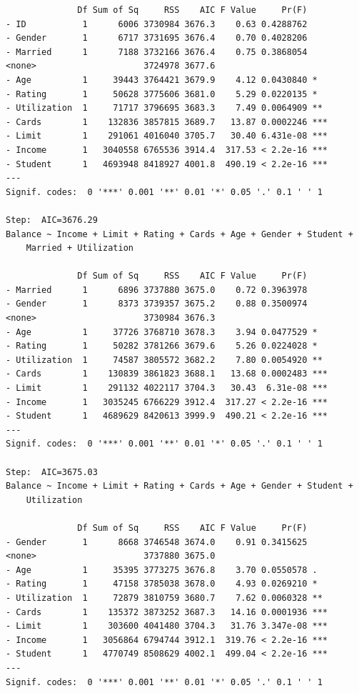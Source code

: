 \documentclass[
]{article}
\begin{document}
\begin{verbatim}
              Df Sum of Sq     RSS    AIC F Value     Pr(F)    
- ID           1      6006 3730984 3676.3    0.63 0.4288762    
- Gender       1      6717 3731695 3676.4    0.70 0.4028206    
- Married      1      7188 3732166 3676.4    0.75 0.3868054    
<none>                     3724978 3677.6                      
- Age          1     39443 3764421 3679.9    4.12 0.0430840 *  
- Rating       1     50628 3775606 3681.0    5.29 0.0220135 *  
- Utilization  1     71717 3796695 3683.3    7.49 0.0064909 ** 
- Cards        1    132836 3857815 3689.7   13.87 0.0002246 ***
- Limit        1    291061 4016040 3705.7   30.40 6.431e-08 ***
- Income       1   3040558 6765536 3914.4  317.53 < 2.2e-16 ***
- Student      1   4693948 8418927 4001.8  490.19 < 2.2e-16 ***
---
Signif. codes:  0 '***' 0.001 '**' 0.01 '*' 0.05 '.' 0.1 ' ' 1

Step:  AIC=3676.29
Balance ~ Income + Limit + Rating + Cards + Age + Gender + Student + 
    Married + Utilization

              Df Sum of Sq     RSS    AIC F Value     Pr(F)    
- Married      1      6896 3737880 3675.0    0.72 0.3963978    
- Gender       1      8373 3739357 3675.2    0.88 0.3500974    
<none>                     3730984 3676.3                      
- Age          1     37726 3768710 3678.3    3.94 0.0477529 *  
- Rating       1     50282 3781266 3679.6    5.26 0.0224028 *  
- Utilization  1     74587 3805572 3682.2    7.80 0.0054920 ** 
- Cards        1    130839 3861823 3688.1   13.68 0.0002483 ***
- Limit        1    291132 4022117 3704.3   30.43  6.31e-08 ***
- Income       1   3035245 6766229 3912.4  317.27 < 2.2e-16 ***
- Student      1   4689629 8420613 3999.9  490.21 < 2.2e-16 ***
---
Signif. codes:  0 '***' 0.001 '**' 0.01 '*' 0.05 '.' 0.1 ' ' 1

Step:  AIC=3675.03
Balance ~ Income + Limit + Rating + Cards + Age + Gender + Student + 
    Utilization

              Df Sum of Sq     RSS    AIC F Value     Pr(F)    
- Gender       1      8668 3746548 3674.0    0.91 0.3415625    
<none>                     3737880 3675.0                      
- Age          1     35395 3773275 3676.8    3.70 0.0550578 .  
- Rating       1     47158 3785038 3678.0    4.93 0.0269210 *  
- Utilization  1     72879 3810759 3680.7    7.62 0.0060328 ** 
- Cards        1    135372 3873252 3687.3   14.16 0.0001936 ***
- Limit        1    303600 4041480 3704.3   31.76 3.347e-08 ***
- Income       1   3056864 6794744 3912.1  319.76 < 2.2e-16 ***
- Student      1   4770749 8508629 4002.1  499.04 < 2.2e-16 ***
---
Signif. codes:  0 '***' 0.001 '**' 0.01 '*' 0.05 '.' 0.1 ' ' 1


\end{verbatim}
\end{document}
